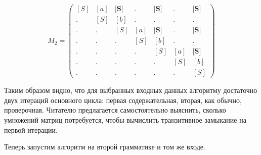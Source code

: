 \begin{example}
$$
M_2 =
\begin{pmatrix}
[S] & [a] & \textbf{[S]} & .   & \textbf{[S]} & .   & \textbf{[S]} \\
.   & [S] & [b]          & .   & .            & .   & .            \\
.   & .   & [S]          & [a] & \textbf{[S]} & .   & \textbf{[S]} \\
.   & .   & .            & [S] & [b]          & .   & .            \\
.   & .   & .            & .   & [S]          & [a] & \textbf{[S]} \\
.   & .   & .            & .   & .            & [S] & [b]          \\
.   & .   & .            & .   & .            & .   & [S] 
\end{pmatrix}
$$

Таким образом видно, что для выбранных входных данных алгоритму достаточно двух итераций основного цикла: первая содержательная, вторая, как обычно, проверочная.
Читателю предлагается самостоятельно выяснить, сколько умножений матриц потребуется, чтобы вычислить транзитивное замыкание на первой итерации.

Теперь запустим алгоритм на второй грамматике и том же входе.


\end{example}
